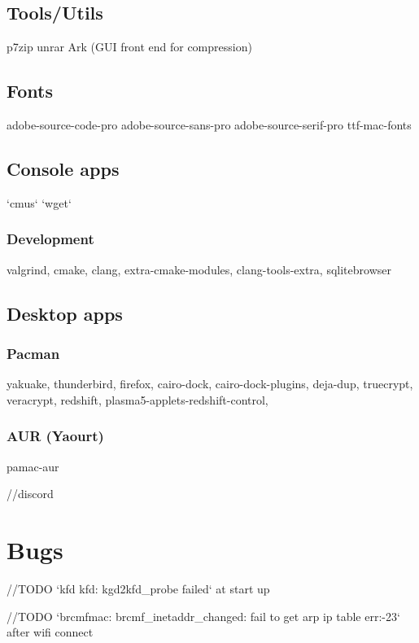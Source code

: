\subsection{Tools/Utils}

p7zip
unrar
Ark (GUI front end for compression)

\subsection{Fonts}

adobe-source-code-pro
adobe-source-sans-pro
adobe-source-serif-pro
ttf-mac-fonts

\subsection{Console apps}

`cmus`
`wget`

\subsubsection{Development}

valgrind, cmake, clang, extra-cmake-modules, clang-tools-extra, 
sqlitebrowser

\subsection{Desktop apps}


\subsubsection{Pacman}

yakuake, thunderbird, firefox, cairo-dock, cairo-dock-plugins, deja-dup, truecrypt, veracrypt, 
redshift, plasma5-applets-redshift-control, 


\subsubsection{AUR (Yaourt)}

pamac-aur

//discord

\section{Bugs}

//TODO `kfd kfd: kgd2kfd\_probe failed` at start up

//TODO `brcmfmac: brcmf\_inetaddr\_changed: fail to get arp ip table err:-23` after wifi connect

